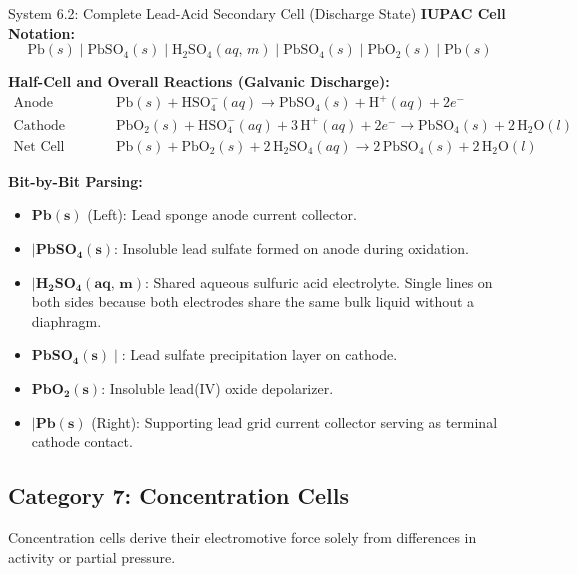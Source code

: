 \documentclass[10pt,a4paper]{article}
\begin{document}
\begin{examplebox}{System 6.2: Complete Lead-Acid Secondary Cell (Discharge State)}
\textbf{IUPAC Cell Notation:}
\begin{equation*}
    \text{Pb}(s) \mid \text{PbSO}_4(s) \mid \text{H}_2\text{SO}_4(aq,\, m) \mid \text{PbSO}_4(s) \mid \text{PbO}_2(s) \mid \text{Pb}(s)
\end{equation*}

\textbf{Half-Cell and Overall Reactions (Galvanic Discharge):}
\begin{align*}
    \text{Anode (Oxidation):} \quad & \text{Pb}(s) + \text{HSO}_4^-(aq) \longrightarrow \text{PbSO}_4(s) + \text{H}^+(aq) + 2e^- \\
    \text{Cathode (Reduction):} \quad & \text{PbO}_2(s) + \text{HSO}_4^-(aq) + 3\,\text{H}^+(aq) + 2e^- \longrightarrow \text{PbSO}_4(s) + 2\,\text{H}_2\text{O}(l) \\
    \text{Net Cell Reaction:} \quad & \text{Pb}(s) + \text{PbO}_2(s) + 2\,\text{H}_2\text{SO}_4(aq) \longrightarrow 2\,\text{PbSO}_4(s) + 2\,\text{H}_2\text{O}(l)
\end{align*}

\textbf{Bit-by-Bit Parsing:}
\begin{itemize}[leftmargin=*]
    \item $\mathbf{Pb(s)}$ (Left): Lead sponge anode current collector.
    \item $\mathbf{\mid PbSO_4(s)}$: Insoluble lead sulfate formed on anode during oxidation.
    \item $\mathbf{\mid H_2SO_4(aq,\, m)}$: Shared aqueous sulfuric acid electrolyte. Single lines on both sides because both electrodes share the same bulk liquid without a diaphragm.
    \item $\mathbf{PbSO_4(s) \mid}$: Lead sulfate precipitation layer on cathode.
    \item $\mathbf{PbO_2(s)}$: Insoluble lead(IV) oxide depolarizer.
    \item $\mathbf{\mid Pb(s)}$ (Right): Supporting lead grid current collector serving as terminal cathode contact.
\end{itemize}
\end{examplebox}

\subsection{Category 7: Concentration Cells}
Concentration cells derive their electromotive force solely from differences in activity or partial pressure.
\end{document}
